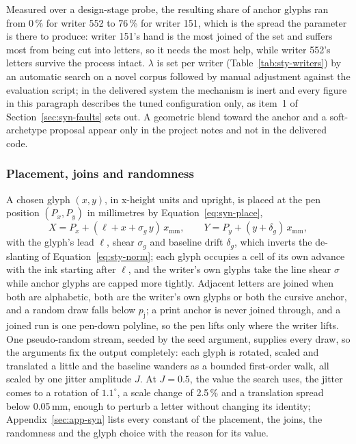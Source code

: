 Measured over a design-stage probe, the resulting share of anchor glyphs ran from 0\,\% for writer 552 to 76\,\% for writer 151, which is the spread the parameter is there to produce: writer 151's hand is the most joined of the set and suffers most from being cut into letters, so it needs the most help, while writer 552's letters survive the process intact.
$\lambda$ is set per writer (Table~\ref{tab:sty-writers}) by an automatic search on a novel corpus followed by manual adjustment against the evaluation script; in the delivered system the mechanism is inert and every figure in this paragraph describes the tuned configuration only, as item~1 of Section~\ref{sec:syn-faults} sets out.
A geometric blend toward the anchor and a soft-archetype proposal appear only in the project notes and not in the delivered code.

\subsubsection{Placement, joins and randomness}

A chosen glyph $(x,y)$, in x-height units and upright, is placed at the pen position $(P_x,P_y)$ in millimetres by Equation~\ref{eq:syn-place},
\begin{equation}
X=P_x+(\ell+x+\sigma_g\,y)\,x_{\mathrm{mm}},\qquad Y=P_y+(y+\delta_g)\,x_{\mathrm{mm}},
\label{eq:syn-place}
\end{equation}
with the glyph's lead $\ell$, shear $\sigma_g$ and baseline drift $\delta_g$, which inverts the de-slanting of Equation~\ref{eq:sty-norm}; each glyph occupies a cell of its own advance with the ink starting after $\ell$, and the writer's own glyphs take the line shear $\sigma$ while anchor glyphs are capped more tightly.
Adjacent letters are joined when both are alphabetic, both are the writer's own glyphs or both the cursive anchor, and a random draw falls below $p_{\mathrm j}$; a print anchor is never joined through, and a joined run is one pen-down polyline, so the pen lifts only where the writer lifts.
One pseudo-random stream, seeded by the seed argument, supplies every draw, so the arguments fix the output completely: each glyph is rotated, scaled and translated a little and the baseline wanders as a bounded first-order walk, all scaled by one jitter amplitude $J$.
At $J=0.5$, the value the search uses, the jitter comes to a rotation of $1.1^\circ$, a scale change of 2.5\,\% and a translation spread below 0.05\,mm, enough to perturb a letter without changing its identity; Appendix~\ref{sec:app-syn} lists every constant of the placement, the joins, the randomness and the glyph choice with the reason for its value.



